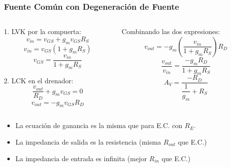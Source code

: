 \begin{frame}[t]
    \frametitle{Fuente Común con Degeneración de Fuente}

    \begin{columns}
        \begin{column}{0.5\textwidth}
            1. LVK por la compuerta:
            \[ v_{in} = v_{GS} + g_m v_{GS} R_S \]
            \[ v_{in} = v_{GS} (1 + g_m R_S) \]
            \[ v_{GS} = \dfrac{v_{in}}{1+g_m R_S} \]

            2. LCK en el drenador:
            \[ \dfrac{v_{out}}{R_D} + g_m v_{GS} = 0 \]
            \[ v_{out} = -g_m v_{GS} R_D \]
        \end{column}
        \begin{column}{0.5\textwidth}
            Combinando las dos expresiones:
            \[ v_{out} = -g_m \left( \dfrac{v_{in}}{1+g_m R_S} \right) R_D \]
            \[ \dfrac{v_{out}}{v_{in}} = \dfrac{-g_m R_D}{1 + g_m R_S} \]
            \[ \boxed{A_V = \dfrac{-R_D}{\dfrac{1}{g_m} + R_S}} \]
        \end{column}
    \end{columns}

    \vspace{5mm}
    \begin{itemize}
        \item La ecuación de ganancia es la misma que para E.C. con $R_E$.
        \item La impedancia de salida es la resistencia (misma $R_{out}$ que E.C.)
        \item La impedancia de entrada es infinita (mejor $R_{in}$ que E.C.)
    \end{itemize}
\end{frame}

